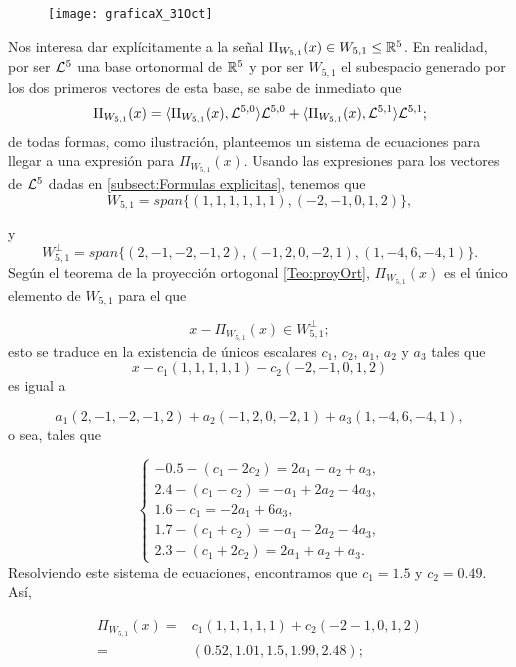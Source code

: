 {\begin{figure}[H]
	\centering
	\texttt{[image: graficaX\_31Oct]} 
\end{figure}	


Nos interesa
dar explícitamente a 
la señal $\Pi_{W_{5,1}}(x) \in W_{5,1} \leq \mathbb{R}^{5}$.
En realidad, por ser $\mathcal{L}^{5}$ 
una base ortonormal de $\mathbb{R}^{5}$ y por ser
$W_{5,1}$ el subespacio generado por los
dos primeros vectores de esta base, 
se sabe de inmediato que
\[
\Pi_{W_{5,1}}(x)=  \langle \Pi_{W_{5,1}}(x), \mathcal{L}^{5,0} \rangle \mathcal{L}^{5,0}
+ \langle \Pi_{W_{5,1}}(x), \mathcal{L}^{5,1} \rangle \mathcal{L}^{5,1};
\]
de todas formas, como ilustración, planteemos un sistema
de ecuaciones para llegar a una expresión para
$\Pi_{W_{5,1}}(x)$.
Usando las expresiones para los vectores
de $\mathcal{L}^{5}$
dadas en \ref{subsect:Formulas explicitas},
tenemos que
\[
W_{5,1}=span\{ (1,1,1,1,1,1), (-2, -1, 0, 1, 2) \},
\]

y 
\[
W_{5,1}^{\perp}=span\{ (2,-1,-2,-1,2), (-1,2,0,-2,1), (1,-4,6,-4,1)\}.
\]
Según el teorema de la proyección ortogonal \ref{Teo:proyOrt},
$\Pi_{W_{5,1}}(x)$ es el único elemento de $W_{5,1}$ para el 
que 

\[
x-\Pi_{W_{5,1}}(x) \in W_{5,1}^{\perp};
\]
esto se 
traduce en la existencia de 
únicos escalares $c_{1}$, $c_{2}$,
$a_{1}$, $a_{2}$ y $a_{3}$ tales que
\[
x-c_{1}(1,1,1,1,1)-c_{2}(-2, -1, 0, 1, 2)
\]
es igual a 

\[
a_{1}(2,-1,-2,-1,2)+a_{2}(-1,2,0,-2,1)
+ a_{3}(1,-4,6,-4,1),
\]
\noindent
o sea, tales que

\begin{equation*}
\begin{cases}
-0.5-(c_{1}-2c_{2})=2a_{1}-a_{2}+a_{3}, \\
2.4-(c_{1}-c_{2})=-a_{1}+2a_{2}-4a_{3}, \\
1.6-c_{1}=-2a_{1}+6a_{3},\\
1.7-(c_{1}+c_{2})=-a_{1}-2a_{2}-4a_{3}, \\
2.3-(c_{1}+2c_{2})=2a_{1}+a_{2}+a_{3}.
\end{cases}
\end{equation*}
Resolviendo este sistema
de ecuaciones, encontramos que
$c_{1}=1.5$ y $c_{2}=0.49$. Así,




\begin{align}
\label{eq0: 8ab}
\Pi_{W_{5,1}}(x) =& c_{1} (1,1,1,1,1) + c_{2}(-2-1,0,1,2) \nonumber \\
= & (0.52, 1.01, 1.5, 1.99, 2.48 );
\end{align}

}
